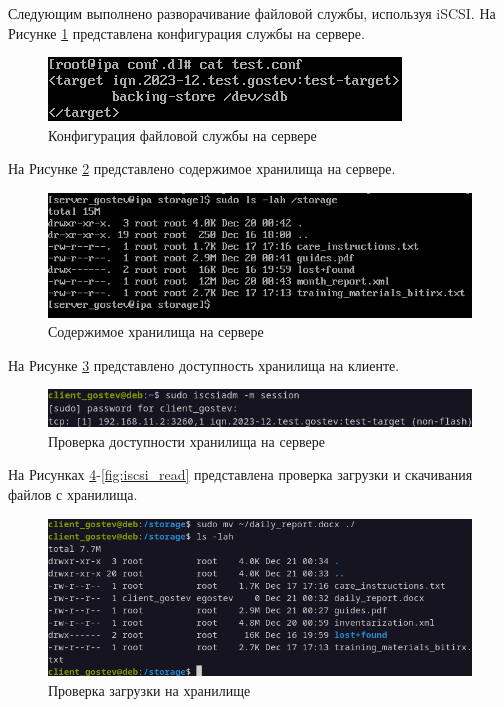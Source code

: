 \documentclass[14pt, a4paper]{extarticle}
\numberwithin{equation}{section}
\begin{document}
Следующим выполнено разворачивание файловой службы, используя iSCSI. 
На Рисунке \ref{fig:iscsi_server_cfg} представлена конфигурация службы на сервере.
\begin{figure}[H]
        \centering
        \includegraphics[scale=1.2]{services/iscsi/server_cfg.png}
        \caption{Конфигурация файловой службы на сервере}
        \label{fig:iscsi_server_cfg}
\end{figure}

На Рисунке \ref{fig:iscsi_server_file_content} представлено содержимое хранилища на сервере.
\begin{figure}[H]
        \centering
        \includegraphics[scale=1.6]{services/iscsi/server_file_content.png}
        \caption{Содержимое хранилища на сервере}
        \label{fig:iscsi_server_file_content}
\end{figure}

На Рисунке \ref{fig:iscsi_connect} представлено доступность хранилища на клиенте.
\begin{figure}[H]
        \centering
        \includegraphics[scale=1]{services/iscsi/connect.png}
        \caption{Проверка доступности хранилища на сервере}
        \label{fig:iscsi_connect}
\end{figure}

На Рисунках \ref{fig:iscsi_write}-\ref{fig:iscsi_read} представлена проверка загрузки и скачивания файлов с хранилища.
\begin{figure}[H]
        \centering
        \includegraphics[scale=0.9]{services/iscsi/write.png}
        \caption{Проверка загрузки на хранилище}
        \label{fig:iscsi_write}
\end{figure}
\end{document}
